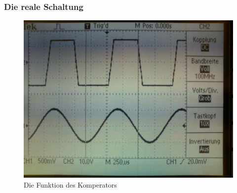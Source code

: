 \subsubsection*{Die reale Schaltung}
\begin{figure}[H]
	\centering
	\includegraphics[width=\linewidth]{versuch6/oszi/DSC_0509.JPG}
	\caption{Die Funktion des Komperators}
\end{figure}

